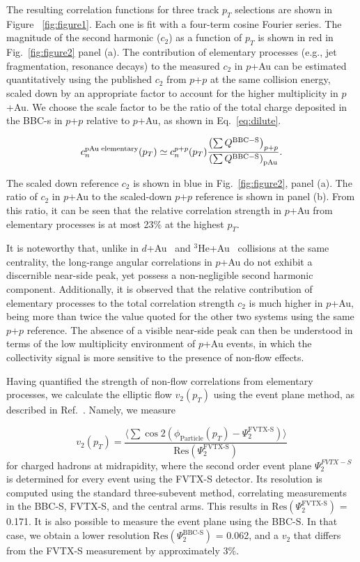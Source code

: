 \documentclass[%
reprint,
showpacs,preprintnumbers,
 amsmath,amssymb,
 aps,
]{revtex4-1}
\newcommand{\pt}{\mbox{$p_T$}\xspace}
\newcommand{\dau}{\mbox{$d$+Au}\xspace}
\newcommand{\pau}{\mbox{$p$+Au}\xspace}
\newcommand{\hau}{\mbox{$^3\text{He}$+Au}\xspace}
\newcommand{\pp}{\mbox{$p$+$p$}\xspace}
\begin{document}
The resulting correlation functions for three track \pt selections are shown in Figure ~\ref{fig:figure1}. Each one is fit with a four-term cosine Fourier series. The magnitude of the second harmonic ($c_{2}$) as a function of \pt is shown in red in Fig.~\ref{fig:figure2} panel (a). The contribution of elementary processes (e.g., jet fragmentation, resonance decays) to the measured $c_2$ in \pau can be estimated quantitatively using the published $c_2$ from \pp at the same collision energy, scaled down by an appropriate factor to account for the higher multiplicity in \pau. We choose the scale factor to be the ratio of the total charge deposited in the BBC-s in \pp relative to \pau, as shown in Eq.~\ref{eq:dilute}. 

\begin{equation}
c_{n}^{{\rm pAu \; elementary}}(p_{T}) \simeq c_{n}^{p+p}(p_{T})
\frac{\left( \sum Q^{{\rm BBC-S}} \right)_{p+p}}
{\left( \sum Q^{{\rm BBC-S}} \right)_{{\rm pAu}}
}.
\label{eq:dilute}
\end{equation}

The scaled down reference $c_{2}$ is shown in blue in Fig.~\ref{fig:figure2}, panel (a). The ratio of $c_2$ in \pau to the scaled-down \pp reference is shown in panel (b). From this ratio, it can be seen that the relative correlation strength in \pau from elementary processes is at most 23\% at the highest \pt.

It is noteworthy that, unlike in \dau~\cite{adare_measurement_2014} and \hau~\cite{PhysRevLett.115.142301} collisions at the same centrality, the long-range angular correlations in \pau do not exhibit a discernible near-side peak, yet possess a non-negligible second harmonic component. Additionally, it is observed that the relative contribution of elementary processes to the total correlation strength $c_2$ is much higher in \pau, being more than twice the value quoted for the other two systems using the same \pp reference. The absence of a visible near-side peak can then be understood in terms of the low multiplicity environment of \pau events, in which the collectivity signal is more sensitive to the presence of non-flow effects.

Having quantified the strength of non-flow correlations from elementary processes, we calculate the elliptic flow $v_2(p_T)$ using the event plane method, as described in Ref.~\cite{Poskanzer:1998yz}. Namely, we measure 

\begin{equation}
v_{2}(p_{T}) = \frac{\langle\sum \cos 2(\phi_{\text{Particle}}(p_{T})-\Psi^{\text{FVTX-S}}_{2})\rangle}{\text{Res}(\Psi^{\text{FVTX-S}}_{2})}
\end{equation}
for charged hadrons at midrapidity, where the second order event plane $\Psi^{FVTX-S}_{2}$ is determined for every event using the FVTX-S detector. Its resolution is computed using the standard three-subevent method, correlating measurements in the BBC-S, FVTX-S, and the central arms. This results in $\text{Res}(\Psi^{\text{FVTX-S}}_{2})$ = 0.171. It is also possible to measure the event plane using the BBC-S. In that case, we obtain a lower resolution $\text{Res}(\Psi^{\text{BBC-S}}_{2})$ = 0.062, and a $v_2$ that differs from the FVTX-S measurement by approximately 3\%.
\end{document}
